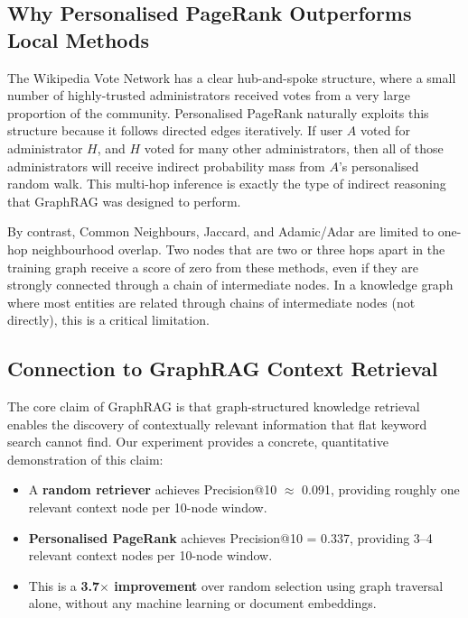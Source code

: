 \documentclass[10pt]{article}
\begin{document}
\subsection{Why Personalised PageRank Outperforms Local Methods}

The Wikipedia Vote Network has a clear hub-and-spoke structure, where a small number of highly-trusted administrators received votes from a very large proportion of the community. Personalised PageRank naturally exploits this structure because it follows directed edges iteratively. If user $A$ voted for administrator $H$, and $H$ voted for many other administrators, then all of those administrators will receive indirect probability mass from $A$'s personalised random walk. This multi-hop inference is exactly the type of indirect reasoning that GraphRAG was designed to perform.

By contrast, Common Neighbours, Jaccard, and Adamic/Adar are limited to one-hop neighbourhood overlap. Two nodes that are two or three hops apart in the training graph receive a score of zero from these methods, even if they are strongly connected through a chain of intermediate nodes. In a knowledge graph where most entities are related through chains of intermediate nodes (not directly), this is a critical limitation.

\subsection{Connection to GraphRAG Context Retrieval}

The core claim of GraphRAG \cite{edge2024} is that graph-structured knowledge retrieval enables the discovery of contextually relevant information that flat keyword search cannot find. Our experiment provides a concrete, quantitative demonstration of this claim:

\begin{itemize}
  \item A \textbf{random retriever} achieves Precision@10 $\approx$ 0.091, providing roughly one relevant context node per 10-node window.
  \item \textbf{Personalised PageRank} achieves Precision@10 = 0.337, providing 3--4 relevant context nodes per 10-node window.
  \item This is a \textbf{3.7$\times$ improvement} over random selection using graph traversal alone, without any machine learning or document embeddings.
\end{itemize}
\end{document}
